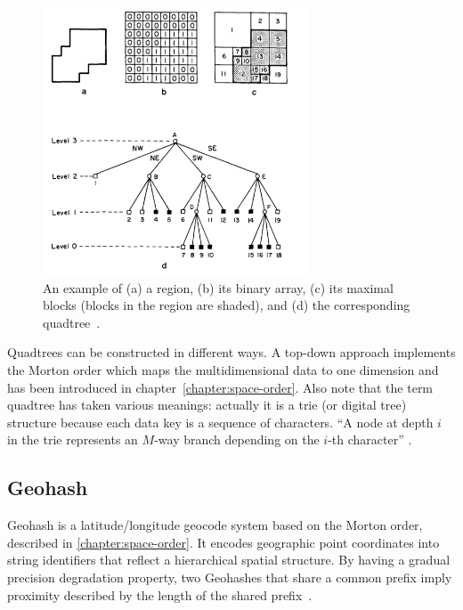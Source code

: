 \begin{figure}[h]
  \begin{center}
    \includegraphics[width=0.7\textwidth]{figures/quadtree.png}
    \caption{An example of (a) a region, (b) its binary array, (c) its maximal blocks (blocks in the region are shaded), and (d) the corresponding quadtree~\cite[p 3]{Samet90spatialdata}.}
    \label{fig:quadtree}
  \end{center}
\end{figure}

Quadtrees can be constructed in different ways. A top-down approach implements the Morton order which maps the multidimensional data to one dimension and has been introduced in chapter~\ref{chapter:space-order}. Also note that the term quadtree has taken various meanings: actually it is a trie (or digital tree) structure because each data key is a sequence of characters. ``A node at depth $i$ in the trie represents an $M$-way branch depending on the $i$-th character'' \cite{Samet90spatialdata}.

\subsection{Geohash}
\label{chapter:geohash}

Geohash is a latitude/longitude geocode system based on the Morton order, described in \ref{chapter:space-order}. It encodes geographic point coordinates into string identifiers that reflect a hierarchical spatial structure. By having a gradual precision degradation property, two Geohashes that share a common prefix imply proximity described by the length of the shared prefix~\cite{wiki:geohash, Smiley11geohash}.

